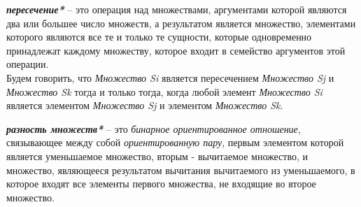 \begin{SCn}
\end{SCn}

\textbf{\textit{пересечение*}} – это операция над множествами, аргументами которой являются два или большее число множеств, а результатом является множество, элементами которого являются все те и только те сущности, которые одновременно принадлежат каждому множеству, которое входит в семейство аргументов этой операции.\\
	Будем говорить, что \textit{Множество Si} является пересечением \textit{Множество Sj} и \textit{Множество Sk} тогда и только тогда, когда любой элемент \textit{Множество Si} является элементом \textit{Множество Sj} и элементом \textit{Множество Sk}.

\begin{SCn}
\end{SCn}

\textbf{\textit{разность множеств*}} – это \textit{бинарное ориентированное отношение}, связывающее между собой \textit{ориентированную пару}, первым элементом которой является уменьшаемое множество, вторым - вычитаемое множество, и множество, являющееся результатом вычитания вычитаемого из уменьшаемого, в которое входят все элементы первого множества, не входящие во второе множество.

\begin{SCn}
\end{SCn}

